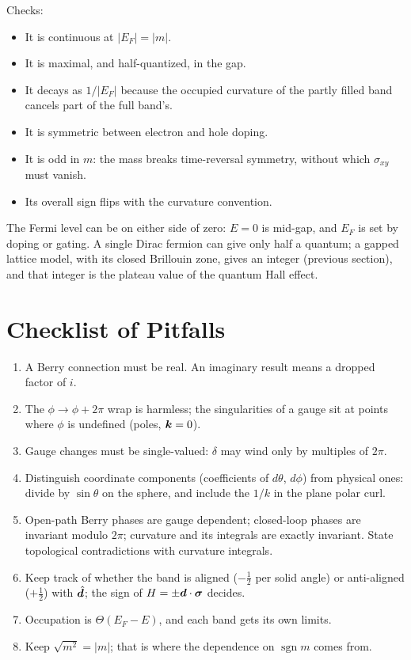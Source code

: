 Checks:
\begin{itemize}
    \item It is continuous at $|E_F| = |m|$.
    \item It is maximal, and half-quantized, in the gap.
    \item It decays as $1/|E_F|$ because the occupied curvature of the partly filled band cancels part of the full band's.
    \item It is symmetric between electron and hole doping.
    \item It is odd in $m$: the mass breaks time-reversal symmetry, without which $\sigma_{xy}$ must vanish.
    \item Its overall sign flips with the curvature convention.
\end{itemize}
The Fermi level can be on either side of zero: $E = 0$ is mid-gap, and $E_F$ is set by doping or gating. A single Dirac fermion can give only half a quantum; a gapped lattice model, with its closed Brillouin zone, gives an integer (previous section), and that integer is the plateau value of the quantum Hall effect.

\section{Checklist of Pitfalls}

\begin{enumerate}
    \item A Berry connection must be real. An imaginary result means a dropped factor of $i$.
    \item The $\phi\to\phi+2\pi$ wrap is harmless; the singularities of a gauge sit at points where $\phi$ is undefined (poles, $\bm{k} = 0$).
    \item Gauge changes must be single-valued: $\delta$ may wind only by multiples of $2\pi$.
    \item Distinguish coordinate components (coefficients of $d\theta$, $d\phi$) from physical ones: divide by $\sin\theta$ on the sphere, and include the $1/k$ in the plane polar curl.
    \item Open-path Berry phases are gauge dependent; closed-loop phases are invariant modulo $2\pi$; curvature and its integrals are exactly invariant. State topological contradictions with curvature integrals.
    \item Keep track of whether the band is aligned ($-\frac12$ per solid angle) or anti-aligned ($+\frac12$) with $\hat{\bm{d}}$; the sign of $H = \pm\bm{d}\cdot\bm{\sigma}$ decides.
    \item Occupation is $\Theta(E_F-E)$, and each band gets its own limits.
    \item Keep $\sqrt{m^2} = |m|$; that is where the dependence on $\operatorname{sgn}m$ comes from.
\end{enumerate}


